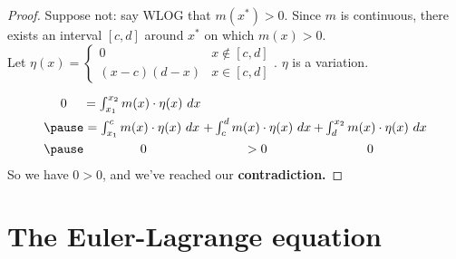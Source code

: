 \documentclass[handout]{beamer}
\begin{document}
\begin{frame}
\begin{proof}
Suppose not: \pause say WLOG that $m(x^*) > 0$. \pause Since $m$ is continuous, there exists an interval $[c,d]$ around $x^*$ on which $m(x) > 0$. \\\pause
Let $\eta(x) = 
\begin{cases} 
    0 & x\not\in[c,d] \\
    (x-c)(d-x) & x \in[c,d]
\end{cases}
$. \pause \quad $\eta$ is a variation. \pause

\[\arraycolsep=1pt
\begin{array}{cccc}
0 &= \int_{x_1}^{x_2}m(x) \cdot \eta(x)\ dx & & \\[5pt] \pause
  &= \int_{x_1}^{c}m(x) \cdot \eta(x)\ dx &
      + \int_{c}^{d}m(x) \cdot \eta(x)\ dx &
      + \int_{d}^{x_2}m(x) \cdot \eta(x)\ dx  \\[5pt] \pause
  & 0 & >0 & 0
\end{array}
\]\pause
So we have $0 > 0$, and we've reached our \textbf{contradiction.}
\end{proof}
\end{frame}

\section[Euler-Lagrange]{The Euler-Lagrange equation}
\end{document}
